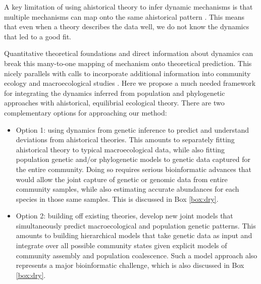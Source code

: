 \documentclass[12pt]{article}
\newcounter{Box}
\providecommand{\DIFdelbegin}{} %
\begin{document}
A key limitation of using ahistorical theory to infer dynamic
mechanisms is that multiple mechanisms can map onto the same ahistorical pattern \citep{Kendall1948-pj, Kendall1948-ri,
  Engen1996-jt, Engen1996-na, McGill2003-sf}.  This means that even
when a theory describes the data well, we do not know the
dynamics that led to a good fit. 
% 
% 

Quantitative theoretical foundations and direct information about
dynamics can break this many-to-one mapping of mechanism onto
theoretical prediction. This nicely parallels with calls to incorporate
additional information into community ecology and macroecological
studies \citep{McGill2007-zd}. Here we propose a much needed framework for
% 
% 
% 
% 
integrating the dynamics inferred from population and phylogenetic
approaches with ahistorical, equilibrial ecological theory. There are
two complementary options for approaching our method:

\begin{itemize}
\item Option 1: using dynamics from genetic inference to predict and
  understand deviations from ahistorical theories. This amounts to
  separately fitting ahistorical theory to typical macroecological
  data, while also fitting population genetic
  and/or phylogenetic models to genetic data captured
  for the entire community. Doing so requires serious bioinformatic
  advances that would allow the joint capture of genetic or genomic
  data from entire community samples, while also estimating accurate
  abundances for each species in those same samples. This is discussed
  in Box \ref{box:dry}.
\item Option 2: building off existing theories, develop new joint
  models that simultaneously predict macroecological and population
  genetic patterns. This amounts to building hierarchical models that
  take genetic data as input and integrate over all possible community
  states given explicit models of community assembly and population
  coalescence. Such a model approach also represents a major
  bioinformatic challenge, which is also discussed in Box
  \ref{box:dry}.
\end{itemize}
\DIFdelbegin %
\end{document}
